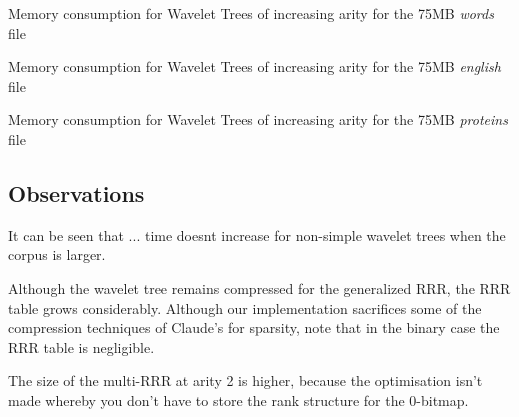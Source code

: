 			{Memory consumption for Wavelet Trees of increasing arity for
			the 75MB \emph{words} file}
			
			{Memory consumption for Wavelet Trees of increasing arity for
			the 75MB \emph{english} file}
			
			{Memory consumption for Wavelet Trees of increasing arity for
			the 75MB \emph{proteins} file}

\subsection{Observations}
It can be seen that ... time doesnt increase for 
non-simple wavelet trees when the corpus is larger.

Although the wavelet tree remains compressed for the generalized RRR, the RRR 
table grows considerably. Although our implementation sacrifices some of the
compression techniques of Claude's for sparsity, note that in the binary case 
the RRR table is negligible.

The size of the multi-RRR at arity 2 is higher, because the optimisation isn't 
made whereby you don't have to store the rank structure for the 0-bitmap.
